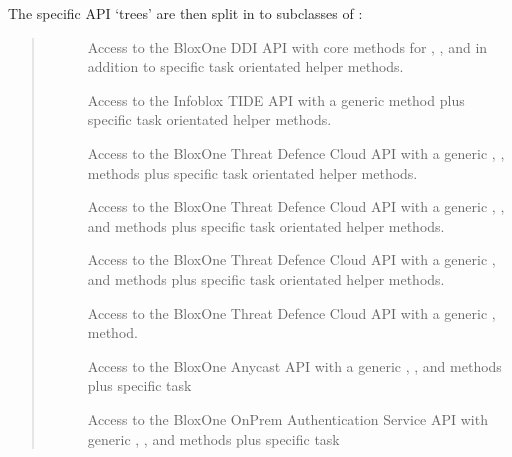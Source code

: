\documentclass[letterpaper,10pt,english]{sphinxmanual}
\begin{document}
\sphinxAtStartPar
The specific API ‘trees’ are then split in to subclasses of :
\begin{quote}
\begin{description}
\item[{}] \leavevmode
\sphinxAtStartPar
Access to the BloxOne DDI API with core methods for , ,
 and  in addition to specific task orientated helper
methods.

\item[{}] \leavevmode
\sphinxAtStartPar
Access to the Infoblox TIDE API with a generic  method plus
specific task orientated helper methods.

\item[{}] \leavevmode
\sphinxAtStartPar
Access to the BloxOne Threat Defence Cloud API with a generic
, ,  methods plus specific task orientated
helper methods.

\item[{}] \leavevmode
\sphinxAtStartPar
Access to the BloxOne Threat Defence Cloud API with a generic
, ,  and  methods plus specific task
orientated helper methods.

\item[{}] \leavevmode
\sphinxAtStartPar
Access to the BloxOne Threat Defence Cloud API with a generic
, and  methods plus specific task orientated helper
methods.

\item[{}] \leavevmode
\sphinxAtStartPar
Access to the BloxOne Threat Defence Cloud API with a generic
, method.

\item[{}] \leavevmode
\sphinxAtStartPar
Access to the BloxOne Anycast API with a generic
, ,  and  methods plus specific task

\item[{}] \leavevmode
\sphinxAtStartPar
Access to the BloxOne On\sphinxhyphen{}Prem Authentication Service API with generic
, ,  and  methods plus specific task


\end{description}
\end{quote}
\end{document}
